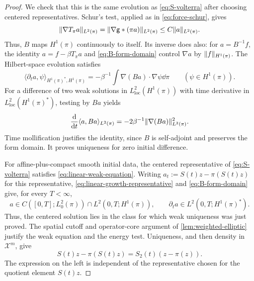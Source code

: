 \documentclass[11pt,reqno]{amsart}
\numberwithin{equation}{section}
\theoremstyle{plain}
\theoremstyle{remark}
\DeclarePairedDelimiter{\norm}{\lVert}{\rVert}
\newcommand{\Xspace}{\mathcal X}
\begin{document}
\begin{proof}
We check that this is the same evolution as \eqref{eq:S-volterra} after choosing centered representatives. Schur's test, applied as in \eqref{eq:force-schur}, gives
\begin{equation}\label{eq:B-form-domain}
 \norm{\nabla T_\pi a}_{L^2(\pi)}
  =\norm{\nabla\g*(\pi a)}_{L^2(\pi)}\le C\norm a_{L^2(\pi)}.
\end{equation}
Thus, $B$ maps $H^1(\pi)$ continuously to itself. Its inverse does also: for $a=B^{-1}f$, the identity $a=f-\beta T_\pi a$ and \eqref{eq:B-form-domain} control $\nabla a$ by $\norm f_{H^1(\pi)}$. The Hilbert-space evolution satisfies
\begin{equation}\label{eq:linear-weak-equation}
 \langle\partial_ta,\psi\rangle_{H^1(\pi)^*,H^1(\pi)}
 =-\beta^{-1}\int\nabla(Ba)\cdot\nabla\psi\dd\pi
 \qquad(\psi\in H^1(\pi)).
\end{equation}
For a difference of two weak solutions in $L^2_{\mathrm{loc}}(H^1(\pi))$ with time derivative in $L^2_{\mathrm{loc}}(H^1(\pi)^*)$, testing by $Ba$ yields
\begin{equation}\label{eq:linear-weak-uniqueness}
 \frac{\mathrm d}{\mathrm dt}\langle a,Ba\rangle_{L^2(\pi)}
 =-2\beta^{-1}\norm{\nabla(Ba)}_{L^2(\pi)}^2.
\end{equation}
Time mollification justifies the identity, since $B$ is self-adjoint and preserves the form domain. It proves uniqueness for zero initial difference.

For affine-plus-compact smooth initial data, the centered representative of \eqref{eq:S-volterra} satisfies \eqref{eq:linear-weak-equation}. Writing $a_t:=S(t)z-\pi(S(t)z)$ for this representative, \eqref{eq:linear-growth-representative} and \eqref{eq:B-form-domain} give, for every $T<\infty$,
\begin{equation}\label{eq:X-semigroup-energy-class}
 a\in C([0,T];L^2_0(\pi))\cap L^2(0,T;H^1(\pi)),
 \qquad \partial_ta\in L^2(0,T;H^1(\pi)^*).
\end{equation}
Thus, the centered solution lies in the class for which weak uniqueness was just proved. The spatial cutoff and operator-core argument of \cref{lem:weighted-elliptic} justify the weak equation and the energy test. Uniqueness, and then density in $\Xspace^m$, give
\begin{equation}\label{eq:semigroup-realization-identity}
 S(t)z-\pi(S(t)z)=S_2(t)(z-\pi(z)).
\end{equation}
The expression on the left is independent of the representative chosen for the quotient element $S(t)z$.


\end{proof}
\end{document}
